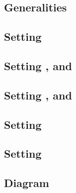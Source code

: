 \subsection{Generalities}                                                                                              \label{bls: generalities for malformed and wellformed}          
\subsection{Setting \malformedDataInternalTot{}}                                                             \label{bls: malformed data internal justification}              
\subsection{Setting \malformedDataInternalBit, \malformedDataInternalAcc{} and \malformedDataInternalTot}    \label{bls: malformed internal bit acc justification}                    
\subsection{Setting \malformedDataExternalBit, \malformedDataExternalAcc{} and \malformedDataExternalTot}    \label{bls: malformed external bit acc justification}                    
\subsection{Setting \nontrivialPairOfPointsBit{}}                                                                         \label{bls: setting nontrivial pair of points bit}                  
\subsection{Setting \nontrivialPairOfPointsAcc{}}                                                                      \label{bls: setting nontrivial pair of points acc}              
\subsection{Diagram}                                                                                                   \label{bls: setting diagrams}                                   

